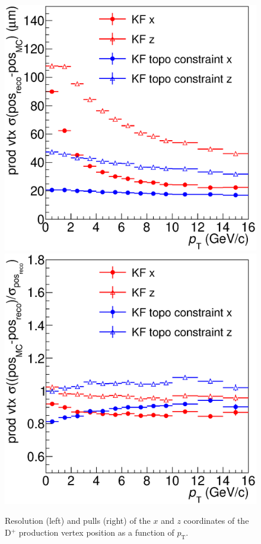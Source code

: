 \documentclass[b5paper,10pt,twoside,oldstyle,classica]{toptesi}
\newcommand{\pt}{p_\text{T}}
\begin{document}
\begin{figure}[tb]
\begin{center}
{\includegraphics[scale = 0.28]{ResPVXZ.eps}}
\hspace{0.cm}
{\includegraphics[scale = 0.28]{PullsPVXZ.eps}}
\caption{Resolution (left) and pulls (right) of the $x$ and $z$ coordinates of the D$^+$ production vertex position as a function of $\pt$.}
\label{KF_prodvtx}
\end{center}
\end{figure} 
\end{document}
